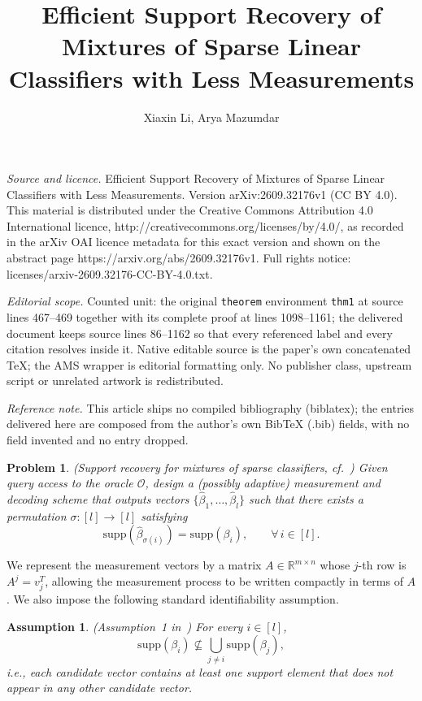 \documentclass[10pt,a4paper]{amsart}
\newtheorem{problem}{Problem}[section]
\newtheorem{assumption}{Assumption}[section]
\newcommand{\supp}{\mathrm{supp}}
\begin{document}
\title[Efficient Support Recovery of Mixtures of Sparse Linear Clas]{Efficient Support Recovery of Mixtures of Sparse Linear Classifiers with Less Measurements}
\author{Xiaxin Li, Arya Mazumdar}
\date{}
\maketitle
\noindent\emph{Source and licence.} Efficient Support Recovery of Mixtures of Sparse Linear Classifiers with Less Measurements. Version arXiv:2609.32176v1 (CC BY 4.0). This material is distributed under the Creative Commons Attribution 4.0 International licence, http://creativecommons.org/licenses/by/4.0/, as recorded in the arXiv OAI licence metadata for this exact version and shown on the abstract page https://arxiv.org/abs/2609.32176v1. Full rights notice: licenses/arxiv-2609.32176-CC-BY-4.0.txt.\par\smallskip
\noindent\textit{Editorial scope.} Counted unit: the original \texttt{theorem} environment \texttt{thm1} at source lines 467--469 together with its complete proof at lines 1098--1161; the delivered document keeps source lines 86--1162 so that every referenced label and every citation resolves inside it. Native editable source is the paper's own concatenated TeX; the AMS wrapper is editorial formatting only. No publisher class, upstream script or unrelated artwork is redistributed.\par\smallskip\noindent\textit{Reference note.} This article ships no compiled bibliography (biblatex); the entries delivered here are composed from the author's own BibTeX (.bib) fields, with no field invented and no entry dropped.
\begin{problem}\label{Problem1}
(Support recovery for mixtures of sparse classifiers, cf.~\cite{gandikota2020recovery})
Given query access to the oracle $\mathcal{O}$, design a (possibly adaptive) measurement and decoding scheme that outputs vectors $\{\hat{\beta}_1,\dots,\hat{\beta}_l\}$ such that there exists a permutation $\sigma:[l]\to[l]$ satisfying
\[
\supp(\hat{\beta}_{\sigma(i)})=\supp(\beta_i),
\qquad \forall\, i\in[l].
\]
\end{problem}

We represent the measurement vectors by a matrix $A\in\mathbb{R}^{m\times n}$ whose $j$-th row is $A^j=v_j^T$, allowing the measurement process to be written compactly in terms of $A$. We also impose the following standard identifiability assumption.

\begin{assumption}\label{Assumption1}
(Assumption~1 in~\cite{gandikota2020recovery})
For every $i\in[l]$,
\[
\supp(\beta_i)\nsubseteq\bigcup_{j\neq i}\supp(\beta_j),
\]
i.e., each candidate vector contains at least one support element that does not appear in any other candidate vector.
\end{assumption}
\end{document}
